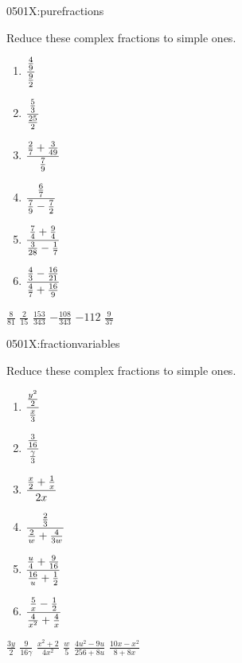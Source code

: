 
\begin{defproblem}{0501X:purefractions}%
\begin{onlyproblem}%
\begin{exercise}
Reduce these complex fractions to simple ones.
\begin{enumerate}
\item $\cfrac{\frac{4}{9}}{\frac{9}{2}}$
\item $\cfrac{\frac{5}{3}}{\frac{25}{2}}$
\item $\cfrac{\frac{2}{7}+\frac{3}{49}}{\frac{7}{9}}$
\item $\cfrac{\frac{6}{7}}{\frac{7}{9}-\frac{7}{2}}$
\item $\cfrac{\frac{7}{4}+\frac{9}{4}}{\frac{3}{28}-\frac{1}{7}}$
\item $\cfrac{\frac{4}{3}-\frac{16}{21}}{\frac{4}{7}+\frac{16}{9}}$
\end{enumerate}
\end{exercise}
\end{onlyproblem}%
\begin{onlysolution}%
$\frac{8}{81}$
$\frac{2}{15}$
$\frac{153}{343}$
$-\frac{108}{343}$
$-112$
$\frac{9}{37}$
\end{onlysolution}%
\end{defproblem}

\begin{defproblem}{0501X:fractionvariables}%
\begin{onlyproblem}%
\begin{exercise}
Reduce these complex fractions to simple ones.
\begin{enumerate}
\item $\cfrac{\frac{y^2}{2}}{\frac{x}{3}}$
\item $\cfrac{\frac{3}{16}}{\frac{\gamma}{3}}$
\item $\cfrac{\frac{x}{2}+\frac{1}{x}}{2x}$
\item $\cfrac{\frac{2}{3}}{\frac{2}{w}+\frac{4}{3w}}$
\item $\cfrac{\frac{u}{4}+\frac{9}{16}}{\frac{16}{u}+\frac{1}{2}}$
\item $\cfrac{\frac{5}{x}-\frac{1}{2}}{\frac{4}{x^2}+\frac{4}{x}}$
\end{enumerate}
\end{exercise}
\end{onlyproblem}%
\begin{onlysolution}%
$\frac{3y}{2}$
$\frac{9}{16\gamma}$
$\frac{x^2+2}{4x^2}$
$\frac{w}{5}$
$\frac{4u^2-9u}{256+8u}$
$\frac{10x-x^2}{8+8x}$
\end{onlysolution}%
\end{defproblem}

